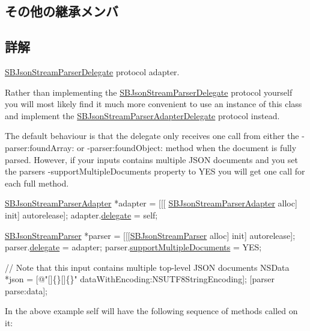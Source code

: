 \subsection*{その他の継承メンバ}


\subsection{詳解}
\hyperlink{protocol_s_b_json_stream_parser_delegate-p}{S\+B\+Json\+Stream\+Parser\+Delegate} protocol adapter. 

Rather than implementing the \hyperlink{protocol_s_b_json_stream_parser_delegate-p}{S\+B\+Json\+Stream\+Parser\+Delegate} protocol yourself you will most likely find it much more convenient to use an instance of this class and implement the \hyperlink{protocol_s_b_json_stream_parser_adapter_delegate-p}{S\+B\+Json\+Stream\+Parser\+Adapter\+Delegate} protocol instead.

The default behaviour is that the delegate only receives one call from either the -\/parser\+:found\+Array\+: or -\/parser\+:found\+Object\+: method when the document is fully parsed. However, if your inputs contains multiple J\+S\+O\+N documents and you set the parser\textquotesingle{}s -\/support\+Multiple\+Documents property to Y\+E\+S you will get one call for each full method.


\begin{DoxyCode}
\hyperlink{interface_s_b_json_stream_parser_adapter}{SBJsonStreamParserAdapter} *adapter = [[[
      \hyperlink{interface_s_b_json_stream_parser_adapter}{SBJsonStreamParserAdapter} alloc] init] autorelease];
adapter.\hyperlink{interface_s_b_json_stream_parser_adapter_a9d336f9c9e1caf3291f80918cb13188e}{delegate} = \textcolor{keyword}{self};

\hyperlink{interface_s_b_json_stream_parser}{SBJsonStreamParser} *parser = [[[\hyperlink{interface_s_b_json_stream_parser}{SBJsonStreamParser} alloc] init] 
      autorelease];
parser.\hyperlink{interface_s_b_json_stream_parser_a1a4e90ce1ca9b55e7696db77ef6bf20c}{delegate} = adapter;
parser.\hyperlink{interface_s_b_json_stream_parser_afd976c605b67edbb8b7abbebcc5b4093}{supportMultipleDocuments} = YES;

\textcolor{comment}{// Note that this input contains multiple top-level JSON documents}
NSData *json = [\textcolor{stringliteral}{@"[]\{\}[]\{\}"} dataWithEncoding:NSUTF8StringEncoding]; 
[parser parse:data];
\end{DoxyCode}


In the above example {\ttfamily self} will have the following sequence of methods called on it\+:

